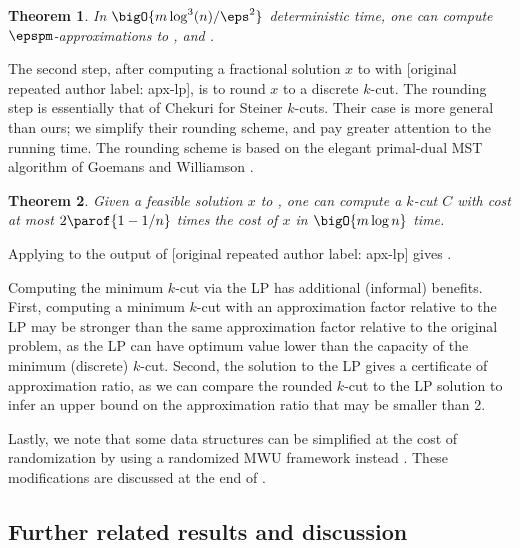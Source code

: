 \documentclass[11pt]{article}
\numberwithin{equation}{section}
\newtheorem{theorem}{Theorem}[section]
\theoremstyle{definition}
\theoremstyle{plain}
\begin{document}
\begin{theorem}
  In $\bigO{m \log^3(n) / \eps^2}$ deterministic time, one can compute
  $\epspm$-approximations  %
  to ,  and
  .
\end{theorem}


The second step, after computing a fractional solution $x$ to
 with [original repeated author label: apx-lp], is to round $x$ to a
discrete $k$-cut. The rounding step is essentially that of Chekuri
\etal \cite{cgn-06} for Steiner $k$-cuts. Their case is more general
than ours; we simplify their rounding scheme, and pay greater
attention to the running time. The rounding scheme is based on the
elegant primal-dual MST algorithm of Goemans and Williamson
\cite{gw-95}.
\begin{theorem}
   Given a feasible solution $x$ to
  , one can compute a $k$-cut $C$ with cost at most
  $2 \parof{1 - 1/n}$ times the cost of $x$ in $\bigO{m \log n}$ time.
\end{theorem}

Applying  to the output of [original repeated author label: apx-lp]
gives .

Computing the minimum $k$-cut via the LP  has
additional (informal) benefits. First, computing a minimum $k$-cut
with an approximation factor relative to the LP may be stronger than
the same approximation factor relative to the original problem, as the
LP can have optimum value lower than the capacity of the minimum
(discrete) $k$-cut. Second, the solution to the LP gives a certificate
of approximation ratio, as we can compare the rounded $k$-cut to the
LP solution to infer an upper bound on the approximation ratio that
may be smaller than 2.

Lastly, we note that some data structures can be simplified at the
cost of randomization by using a randomized MWU framework instead
\cite{cq-18-soda}. These modifications are discussed at the end of
.

\subsection{Further related results and discussion}
\end{document}
